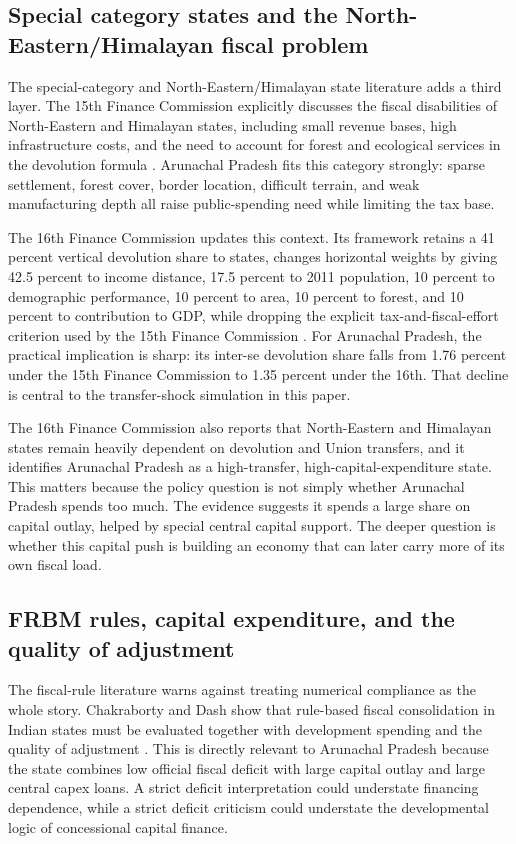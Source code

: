 \documentclass[11pt,a4paper]{article}
\begin{document}
\subsection{Special category states and the North-Eastern/Himalayan fiscal problem}

The special-category and North-Eastern/Himalayan state literature adds a third layer. The 15th Finance Commission explicitly discusses the fiscal disabilities of North-Eastern and Himalayan states, including small revenue bases, high infrastructure costs, and the need to account for forest and ecological services in the devolution formula \cite{fifteenth_fc_2020}. Arunachal Pradesh fits this category strongly: sparse settlement, forest cover, border location, difficult terrain, and weak manufacturing depth all raise public-spending need while limiting the tax base.

The 16th Finance Commission updates this context. Its framework retains a 41 percent vertical devolution share to states, changes horizontal weights by giving 42.5 percent to income distance, 17.5 percent to 2011 population, 10 percent to demographic performance, 10 percent to area, 10 percent to forest, and 10 percent to contribution to GDP, while dropping the explicit tax-and-fiscal-effort criterion used by the 15th Finance Commission \cite{sixteenth_fc_2026,prs16fc}. For Arunachal Pradesh, the practical implication is sharp: its inter-se devolution share falls from 1.76 percent under the 15th Finance Commission to 1.35 percent under the 16th. That decline is central to the transfer-shock simulation in this paper.

The 16th Finance Commission also reports that North-Eastern and Himalayan states remain heavily dependent on devolution and Union transfers, and it identifies Arunachal Pradesh as a high-transfer, high-capital-expenditure state. This matters because the policy question is not simply whether Arunachal Pradesh spends too much. The evidence suggests it spends a large share on capital outlay, helped by special central capital support. The deeper question is whether this capital push is building an economy that can later carry more of its own fiscal load.

\subsection{FRBM rules, capital expenditure, and the quality of adjustment}

The fiscal-rule literature warns against treating numerical compliance as the whole story. Chakraborty and Dash show that rule-based fiscal consolidation in Indian states must be evaluated together with development spending and the quality of adjustment \cite{chakraborty_dash_2013}. This is directly relevant to Arunachal Pradesh because the state combines low official fiscal deficit with large capital outlay and large central capex loans. A strict deficit interpretation could understate financing dependence, while a strict deficit criticism could understate the developmental logic of concessional capital finance.
\end{document}

